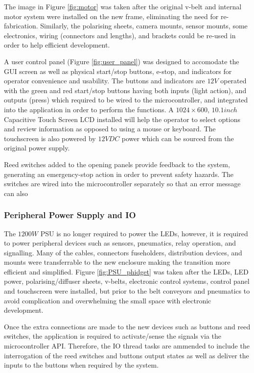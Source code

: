 \documentclass[fleqn,twoside]{article}
\begin{document}
The image in Figure \ref{fig:motor} was taken after the original v-belt and internal motor system were installed on the new frame, eliminating the need for re-fabrication. Similarly, the polarising sheets, camera mounts, sensor mounts, some electronics, wiring (connectors and lengths), and brackets could be re-used in order to help efficient development.

A user control panel (Figure \ref{fig:user_panel}) was designed to accomodate the GUI screen as well as physical start/stop buttons, e-stop, and indicators for operator convenience and usability. The buttons and indicators are $12V$ operated with the green and red start/stop buttons having both inputs (light action), and outputs (press) which required to be wired to the microcontroller, and integrated into the application in order to perform the functions. A $1024\times600$, $10.1inch$ Capacitive Touch Screen LCD installed will help the operator to select options and review information as opposed to using a mouse or keyboard. The touchscreen is also powered by $12VDC$ power which can be sourced from the original power supply.

Reed switches added to the opening panels provide feedback to the system, generating an emergency-stop action in order to prevent safety hazards. The switches are wired into the microcontroller separately so that an error message can also



\subsubsection{Peripheral Power Supply and IO}

The $1200W$ PSU is no longer required to power the LEDs, however, it is required to power peripheral devices such as sensors, pneumatics, relay operation, and signalling. Many of the cables, connectors fuseholders, distribution devices, and mounts were transferrable to the new enclosure making the transition more efficient and simplified. Figure \ref{fig:PSU_phidget} was taken after the LEDs, LED power, polarising/diffuser sheets, v-belts, electronic control systems, control panel and touchscreen were installed, but prior to the belt conveyors and pneumatics to avoid complication and overwhelming the small space with electronic development.

Once the extra connections are made to the new devices such as buttons and reed switches, the application is required to activate/sense the signals via the microcontroller API. Therefore, the IO thread tasks are ammended to include the interrogation of the reed switches and buttons output states as well as deliver the inputs to the buttons when required by the system. 
\end{document}
